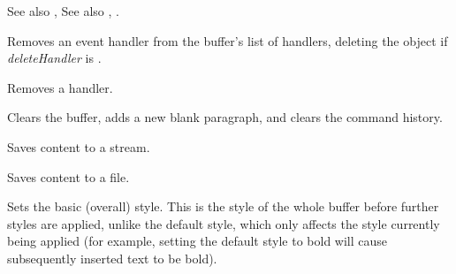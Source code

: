 See also , See also , .

\label{wxrichtextbufferremoveeventhandler}


Removes an event handler from the buffer's list of handlers, deleting the object if {\it deleteHandler} is \true.

\label{wxrichtextbufferremovehandler}


Removes a handler.

\label{wxrichtextbufferresetandclearcommands}


Clears the buffer, adds a new blank paragraph, and clears the command history.

\label{wxrichtextbuffersavefile}


Saves content to a stream.


Saves content to a file.

\label{wxrichtextbuffersetbasicstyle}



Sets the basic (overall) style. This is the style of the whole
buffer before further styles are applied, unlike the default style, which
only affects the style currently being applied (for example, setting the default
style to bold will cause subsequently inserted text to be bold).

\label{wxrichtextbuffersetdefaultstyle}


